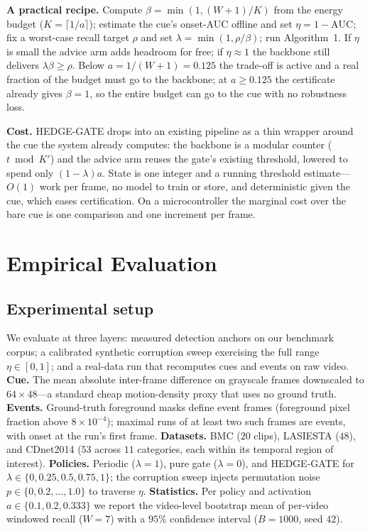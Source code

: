 ﻿\documentclass[lettersize,journal]{IEEEtran}
\begin{document}
\textbf{A practical recipe.} Compute $\beta=\min(1,(W{+}1)/K)$ from the energy budget ($K=\lceil1/a\rceil$); estimate the cue's onset-AUC offline and set $\eta=1-\mathrm{AUC}$; fix a worst-case recall target $\rho$ and set $\lambda=\min(1,\rho/\beta)$; run Algorithm~1. If $\eta$ is small the advice arm adds headroom for free; if $\eta\approx1$ the backbone still delivers $\lambda\beta\ge\rho$. Below $a=1/(W{+}1)=0.125$ the trade-off is active and a real fraction of the budget must go to the backbone; at $a\ge0.125$ the certificate already gives $\beta{=}1$, so the entire budget can go to the cue with no robustness loss.

\textbf{Cost.} HEDGE-GATE drops into an existing pipeline as a thin wrapper around the cue the system already computes: the backbone is a modular counter ($t\bmod K'$) and the advice arm reuses the gate's existing threshold, lowered to spend only $(1{-}\lambda)a$. State is one integer and a running threshold estimate---$O(1)$ work per frame, no model to train or store, and deterministic given the cue, which eases certification. On a microcontroller the marginal cost over the bare cue is one comparison and one increment per frame.

\section{Empirical Evaluation}\label{sec:eval}
\subsection{Experimental setup}
We evaluate at three layers: measured detection anchors on our benchmark corpus; a calibrated synthetic corruption sweep exercising the full range $\eta\in[0,1]$; and a real-data run that recomputes cues and events on raw video. \textbf{Cue.} The mean absolute inter-frame difference on grayscale frames downscaled to $64\times48$---a standard cheap motion-density proxy that uses no ground truth. \textbf{Events.} Ground-truth foreground masks define event frames (foreground pixel fraction above $8\times10^{-4}$); maximal runs of at least two such frames are events, with onset at the run's first frame. \textbf{Datasets.} BMC ($20$ clips), LASIESTA ($48$), and CDnet2014 ($53$ across $11$ categories, each within its temporal region of interest). \textbf{Policies.} Periodic ($\lambda{=}1$), pure gate ($\lambda{=}0$), and HEDGE-GATE for $\lambda\in\{0,0.25,0.5,0.75,1\}$; the corruption sweep injects permutation noise $p\in\{0,0.2,\dots,1.0\}$ to traverse $\eta$. \textbf{Statistics.} Per policy and activation $a\in\{0.1,0.2,0.333\}$ we report the video-level bootstrap mean of per-video windowed recall ($W{=}7$) with a $95\%$ confidence interval ($B{=}1000$, seed $42$).
\end{document}
